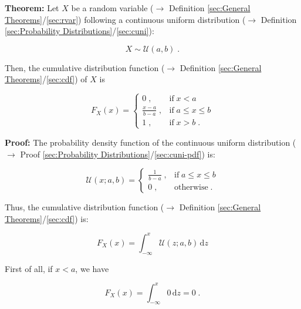 \documentclass[a4paper,12pt,twoside]{book}
\begin{document}
\textbf{Theorem:} Let $X$ be a random variable ($\rightarrow$ Definition \ref{sec:General Theorems}/\ref{sec:rvar}) following a continuous uniform distribution ($\rightarrow$ Definition \ref{sec:Probability Distributions}/\ref{sec:cuni}):

\begin{equation} \label{eq:cuni-cdf-cuni}
X \sim \mathcal{U}(a, b) \; .
\end{equation}

Then, the cumulative distribution function ($\rightarrow$ Definition \ref{sec:General Theorems}/\ref{sec:cdf}) of $X$ is

\begin{equation} \label{eq:cuni-cdf-cuni-cdf}
F_X(x) = \left\{
\begin{array}{rl}
0 \; , & \text{if} \; x < a \\
\frac{x-a}{b-a} \; , & \text{if} \; a \leq x \leq b \\
1 \; , & \text{if} \; x > b \; .
\end{array}
\right.
\end{equation}


\vspace{1em}
\textbf{Proof:} The probability density function of the continuous uniform distribution ($\rightarrow$ Proof \ref{sec:Probability Distributions}/\ref{sec:cuni-pdf}) is:

\begin{equation} \label{eq:cuni-cdf-cuni-pdf}
\mathcal{U}(x; a, b) = \left\{
\begin{array}{rl}
\frac{1}{b-a} \; , & \text{if} \; a \leq x \leq b \\
0 \; , & \text{otherwise} \; .
\end{array}
\right.
\end{equation}

Thus, the cumulative distribution function ($\rightarrow$ Definition \ref{sec:General Theorems}/\ref{sec:cdf}) is:

\begin{equation} \label{eq:cuni-cdf-cuni-cdf-s1}
F_X(x) = \int_{-\infty}^{x} \mathcal{U}(z; a, b) \, \mathrm{d}z
\end{equation}

First of all, if $x < a$, we have

\begin{equation} \label{eq:cuni-cdf-cuni-cdf-s2a}
F_X(x) = \int_{-\infty}^{x} 0 \, \mathrm{d}z = 0 \; .
\end{equation}
\end{document}
